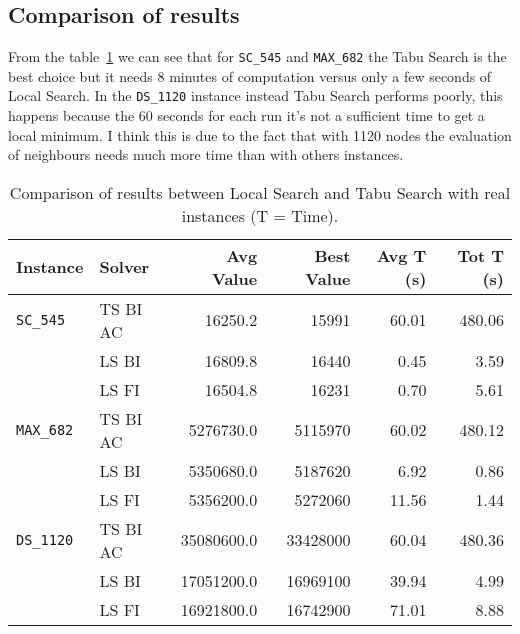 
\subsection{Comparison of results}
	
	From the table~\ref{tab:ri-comparison-results} we can see that for \verb|SC_545| and \verb|MAX_682| the Tabu Search is the best choice but it needs 8 minutes of computation versus only a few seconds of Local Search. In the \verb|DS_1120| instance instead Tabu Search performs poorly, this happens because the 60 seconds for each run it's not a sufficient time to get a local minimum. I think this is due to the fact that with 1120 nodes the evaluation of neighbours needs much more time than with others instances.

	\begin{table}[hb]
		\centering
		\begin{tabular}{llrrrr}
			\toprule
			\textbf{Instance} & \textbf{Solver} & \textbf{Avg Value} & \textbf{Best Value} & \textbf{Avg T (s)} & \textbf{Tot T (s)} \\
			\toprule
			\verb|SC_545|           & TS BI AC        & 16250.2            & 15991               & 60.01                 & 480.06                \\
			& LS BI           & 16809.8            & 16440               & 0.45                  & 3.59                  \\
			& LS FI           & 16504.8            & 16231               & 0.70                  & 5.61                  \\
			\midrule
			\verb|MAX_682|          & TS BI AC        & 5276730.0          & 5115970             & 60.02                 & 480.12                \\
			& LS BI           & 5350680.0          & 5187620             & 6.92                  & 0.86                  \\
			& LS FI           & 5356200.0          & 5272060             & 11.56                 & 1.44                  \\
			\midrule
			\verb|DS_1120|          & TS BI AC        & 35080600.0         & 33428000            & 60.04                 & 480.36                \\
			& LS BI           & 17051200.0         & 16969100            & 39.94                 & 4.99                  \\
			& LS FI           & 16921800.0         & 16742900            & 71.01                 & 8.88    \\
			\bottomrule             
		\end{tabular}
		\caption{Comparison of results between Local Search and Tabu Search with real instances (T = Time).}
		\label{tab:ri-comparison-results}
	\end{table}
